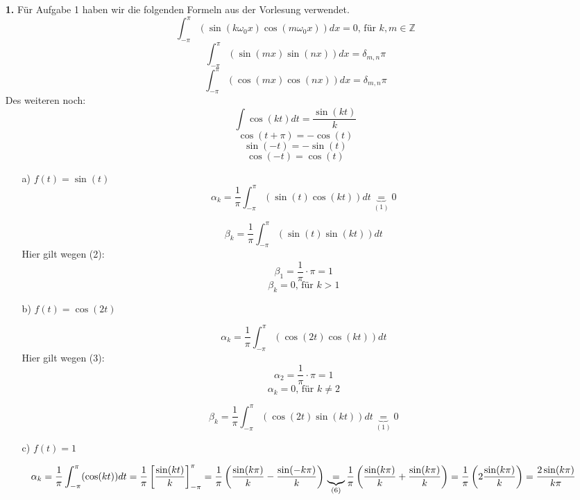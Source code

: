 \documentclass[a4paper,11pt]{article}
\author{\authorinfotitle}
\title{\titleinfo}
\date{\today}
\begin{document}
	\maketitle
	\begin{enumerate}
		\item[\textbf{1.}]
		Für Aufgabe 1 haben wir die folgenden Formeln aus der Vorlesung verwendet.
		\begin{equation}
		\int_{-\pi}^\pi(\sin(k\omega_0x)\cos(m\omega_0x))dx = 0 \text{, für } k,m\in \mathbb{Z}
		\end{equation}
		\begin{equation}
		\int_{-\pi}^{\pi}(\sin(mx)\sin(nx))dx = \delta_{m,n}\pi
		\end{equation}
		\begin{equation}
		\int_{-\pi}^{\pi}(\cos(mx)\cos(nx))dx = \delta_{m,n}\pi
		\end{equation}
		Des weiteren noch:
		\begin{equation}
		\int \cos(kt)dt = \frac{\sin(kt)}{k}
		\end{equation}
		\begin{equation}
		\cos(t+\pi) = -\cos(t)
		\end{equation}
		\begin{equation}
		\sin(-t) = -\sin(t)
		\end{equation}
		\begin{equation}
		\cos(-t) = \cos(t)
		\end{equation}
		\begin{enumerate}
			\item[a)] $f(t) = \sin(t)$
			$$\alpha_k = \frac{1}{\pi} \int_{-\pi}^{\pi}(\sin(t)\cos(kt))dt \underbrace{=}_{(1)} 0$$

			$$\beta_k = \frac{1}{\pi} \int_{-\pi}^{\pi}(\sin(t)\sin(kt))dt$$
			Hier gilt wegen (2):
			$$\beta_1 = \frac{1}{\pi} \cdot \pi = 1$$
			$$\beta_k = 0 \text{, für } k > 1$$

			\item[b)] $f(t) = \cos(2t)$

			$$\alpha_k = \frac{1}{\pi}\int_{-\pi}^{\pi}(\cos(2t)\cos(kt))dt$$
			Hier gilt wegen (3):
			$$\alpha_2 = \frac{1}{\pi} \cdot \pi = 1$$
			$$\alpha_k = 0 \text{, für } k\neq2$$

			$$\beta_k = \frac{1}{\pi}\int_{-\pi}^{\pi}(\cos(2t)\sin(kt))dt \underbrace{=}_{(1)} 0$$

			\item[c)] $f(t) = 1$

			\begin{dmath*}
				\alpha_k = \frac{1}{\pi}\int_{-\pi}^{\pi}(\cos(kt))dt
				= \frac{1}{\pi}\left[ \frac{\sin(kt)}{k}\right]_{-\pi}^{\pi}
				= \frac{1}{\pi}\left(\frac{\sin(k\pi)}{k}-\frac{\sin(-k\pi)}{k} \right) \\
				\underbrace{=}_{(6)} \frac{1}{\pi}\left(\frac{\sin(k\pi)}{k}+\frac{\sin(k\pi)}{k} \right)
				= \frac{1}{\pi}\left(2\frac{\sin(k\pi)}{k} \right)
				= \frac{2\sin(k\pi)}{k\pi}
			\end{dmath*}


\end{enumerate}
\end{enumerate}
\end{document}
